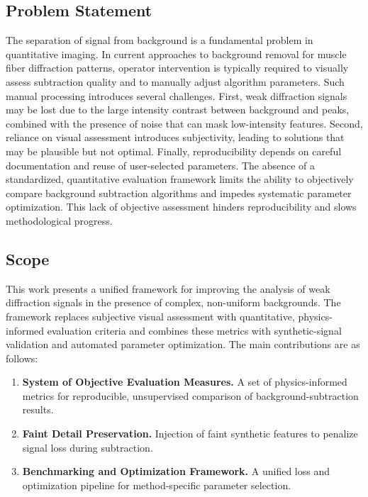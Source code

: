\documentclass[iucr]{iucrjournals}
\begin{document}
\subsection{Problem Statement}

The separation of signal from background is a fundamental problem in quantitative imaging. In current approaches to background removal for muscle fiber diffraction patterns, operator intervention is typically required to visually assess subtraction quality and to manually adjust algorithm parameters. Such manual processing introduces several challenges. First, weak diffraction signals may be lost due to the large intensity contrast between background and peaks, combined with the presence of noise that can mask low-intensity features. Second, reliance on visual assessment introduces subjectivity, leading to solutions that may be plausible but not optimal. Finally, reproducibility depends on careful documentation and reuse of user-selected parameters. The absence of a standardized, quantitative evaluation framework limits the ability to objectively compare background subtraction algorithms and impedes systematic parameter optimization. This lack of objective assessment hinders reproducibility and slows methodological progress.


\subsection{Scope}

This work presents a unified framework for improving the analysis of weak diffraction signals in the presence of complex, non-uniform backgrounds. The framework replaces subjective visual assessment with quantitative, physics-informed evaluation criteria and combines these metrics with synthetic-signal validation and automated parameter optimization. The main contributions are as follows:


\begin{enumerate}
\item \textbf{System of Objective Evaluation Measures.} A set of physics-informed metrics for reproducible, unsupervised comparison of background-subtraction results.
\item \textbf{Faint Detail Preservation.} Injection of faint synthetic features to penalize signal loss during subtraction.
\item \textbf{Benchmarking and Optimization Framework.} A unified loss and optimization pipeline for method-specific parameter selection.
\end{enumerate}
\end{document}
